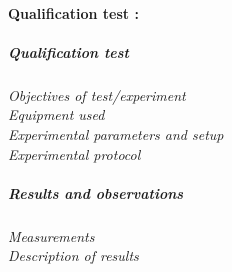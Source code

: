 \paragraph{Qualification test  :}
\subparagraph{Qualification test}
\textit{Objectives of test/experiment}\\
\textit{Equipment used}\\
\textit{Experimental parameters and setup }\\
\textit{Experimental protocol}\\
\subparagraph{Results and observations}
\textit{Measurements}\\
\textit{Description of results}\\



